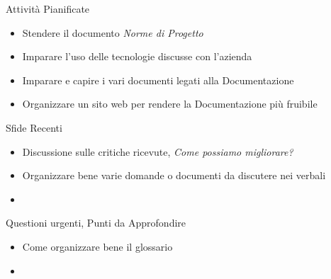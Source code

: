 \documentclass{beamer}
\begin{document}
\begin{frame}
    \begin{block}{Attività Pianificate}
        \begin{itemize}
            \item Stendere il documento \emph{Norme di Progetto} 
            \item Imparare l'uso delle tecnologie discusse con l'azienda
            \item Imparare e capire i vari documenti legati alla Documentazione
            \item Organizzare un sito web per rendere la Documentazione più fruibile
        \end{itemize}
    \end{block}
\end{frame}

\begin{frame}
    \begin{alertblock}{Sfide Recenti}
        \begin{itemize}
            \item Discussione sulle critiche ricevute, \textit{Come possiamo migliorare?}
            \item Organizzare bene varie domande o documenti da discutere nei verbali
            \item 
        \end{itemize}
    \end{alertblock}
\end{frame}

\begin{frame}
    \begin{alertblock}{Questioni urgenti, Punti da Approfondire}
        \begin{itemize}
            \item Come organizzare bene il glossario
            \item 
        \end{itemize}
    \end{alertblock}
\end{frame}
\end{document}
